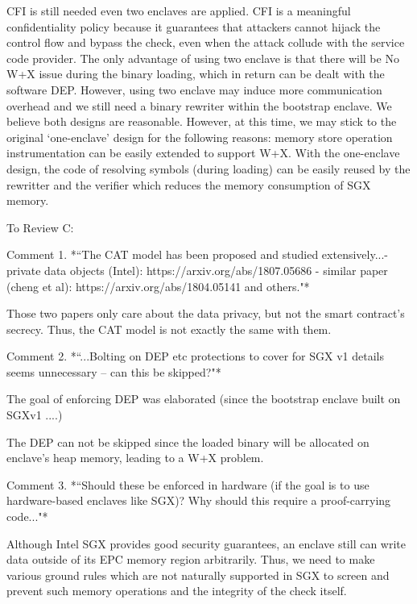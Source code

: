 {CFI is still needed even two enclaves are applied. 
CFI is a meaningful confidentiality policy because it guarantees that attackers cannot hijack the control flow and bypass the check, even when the attack collude with the service code provider.
The only advantage of using two enclave is that there will be No W+X issue during the binary loading, which in return can be dealt with the software DEP. However, using two enclave may induce more communication overhead 
and we still need a binary rewriter within the bootstrap enclave. We believe both designs are reasonable. However, at this time, we may stick to the original `one-enclave' design for the following reasons: memory store operation instrumentation can be easily extended to support W+X. With the one-enclave design, the code of resolving symbols (during loading) can be easily reused by the rewritter and the verifier which reduces the memory consumption of SGX memory. 

To Review C:

Comment 1. *“The CAT model has been proposed and studied extensively...- private data objects (Intel): https://arxiv.org/abs/1807.05686
- similar paper (cheng et al): https://arxiv.org/abs/1804.05141
and others."*

Those two papers only care about the data privacy, but not the smart contract's secrecy. Thus, the CAT model is not exactly the same with them.

Comment 2. *“...Bolting on DEP etc protections to cover for SGX v1 details seems unnecessary -- can this be skipped?"*

The goal of enforcing DEP was elaborated (since the bootstrap enclave built on SGXv1 ....)

The DEP can not be skipped since the loaded binary will be allocated on enclave's heap memory, leading to a W+X problem.

Comment 3. *“Should these be enforced in hardware (if the goal is to use hardware-based enclaves like SGX)? Why should this require a proof-carrying code..."*

Although Intel SGX provides good security guarantees, an enclave still can write data outside of its EPC memory region arbitrarily. Thus, we need to make various ground rules which are not naturally supported in SGX to screen and prevent such memory operations and the integrity of the check itself.

}
